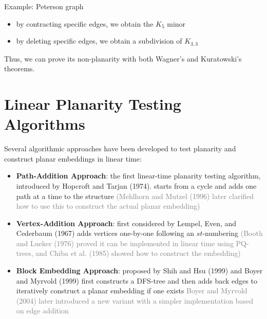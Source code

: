 \documentclass[a4paper, 11pt]{report}
\begin{document}
\begin{gframe}{Example: Peterson graph}
\begin{center}
\end{center}

\begin{itemize}
    \item by contracting specific edges, we obtain the $K_5$ minor
    \item by deleting specific edges, we obtain a subdivision of $K_{3,3}$
\end{itemize}
Thus, we can prove its non-planarity with both Wagner's and Kuratowski's theorems.

\end{gframe}

\section{Linear Planarity Testing Algorithms}
Several algorithmic approaches have been developed to test planarity and construct planar embeddings in linear time:

\begin{itemize}
    \item \textbf{Path-Addition Approach}: the first linear-time planarity testing algorithm, introduced by Hopcroft and Tarjan (1974). 
        \subitem starts from a cycle and adds one path at a time to the structure
        \subitem \textcolor{gray}{(Mehlhorn and Mutzel (1996) later clarified how to use this to construct the actual planar embedding)}
    \item \textbf{Vertex-Addition Approach}: first considered by Lempel, Even, and Cederbaum (1967)
        \subitem  adds vertices one-by-one following an $st$-numbering
        \subitem \textcolor{gray}{(Booth and Lueker (1976) proved it can be implemented in linear time using PQ-trees, and Chiba et al. (1985) showed how to construct the embedding)}
    \item \textbf{Block Embedding Approach}: proposed by Shih and Hsu (1999) and Boyer and Myrvold (1999)
        \subitem first constructs a DFS-tree and then adds back edges to iteratively construct a planar embedding if one exists
        \subitem \textcolor{gray}{Boyer and Myrvold (2004) later introduced a new variant with a simpler implementation based on edge addition}
\end{itemize}
\end{document}
